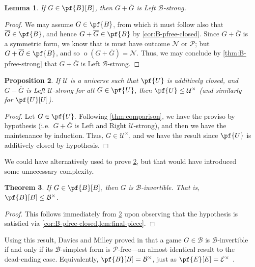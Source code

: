 \documentclass[11pt]{article}
\newtheorem{theorem}{Theorem}[section]
\newtheorem{lemma}[theorem]{Lemma}
\newtheorem{proposition}[theorem]{Proposition}
\theoremstyle{definition}
\DeclareMathOperator{\outcome}{o}
\newcommand{\set}[1]{\mathcal{#1}}
\begin{document}
\begin{lemma}
    \label{lem:final-piece}
    If $G\in\pf{B}[B]$, then $G+\overline{G}$ is Left $\set{B}$-strong.
\end{lemma}

\begin{proof}
    We may assume $G\in\pf{B}$, from which it must follow also that
    $\overline{G}\in\pf{B}$, and hence $G+\overline{G}\in\pf{B}$ by
    \cref{cor:B-pfree-closed}. Since $G+\overline{G}$ is a symmetric form, we
    know that is must have outcome $\mathscr{N}$ or $\mathscr{P}$; but
    $G+\overline{G}\in\pf{B}$, and so $\outcome(G+\overline{G})=\mathscr{N}$.
    Thus, we may conclude by \cref{thm:B-pfree-strong} that $G+\overline{G}$ is
    Left $\set{B}$-strong.
\end{proof}

\begin{proposition}
    \label{lem:p-free-invertible}
    If $\set{U}$ is a universe such that $\pf{U}$ is additively closed, and
    $G+\overline{G}$ is Left $\set{U}$-strong for all $G\in\pf{U}$, then
    $\pf{U}\leq\set{U}^\times$ (and similarly for $\pf{U}[U]$).
\end{proposition}

\begin{proof}
    Let $G\in\pf{U}$. Following \cref{thm:comparison}, we have the proviso by
    hypothesis (i.e.\ $G+\overline{G}$ is Left and Right $\set{U}$-strong), and
    then we have the maintenance by induction. Thus, $G\in\set{U}^\times$, and
    we have the result since $\pf{U}$ is additively closed by hypothesis.
\end{proof}

We could have alternatively used \cite[Theorem 3.8 on
p.~13]{davies.yadav:invertibility} to prove \cref{lem:p-free-invertible}, but
that would have introduced some unnecessary complexity.

\begin{theorem}
    \label{prop:b-pfree-invert}
    If $G\in\pf{B}[B]$, then $G$ is $\set{B}$-invertible. That is,
    $\pf{B}[B]\leq\set{B}^\times$.
\end{theorem}

\begin{proof}
    This follows immediately from \cref{lem:p-free-invertible} upon observing
    that the hypothesis is satisfied via
    \cref{cor:B-pfree-closed,lem:final-piece}.
\end{proof}

Using this result, Davies and Milley proved in \cite{davies.milley:order} that
a game $G\in\set{B}$ is $\set{B}$-invertible if and only if its
$\set{B}$-simplest form is $\mathscr{P}$-free---an almost identical result to
the dead-ending case. Equivalently, $\pf{B}[B]=\set{B}^\times$, just as
$\pf{E}[E]=\set{E}^\times$ \cite{milley.renault:invertible}.
\end{document}
